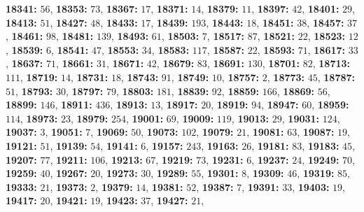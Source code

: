 \textsf{\bfseries 18341:} $56$, \textsf{\bfseries 18353:} $73$, \textsf{\bfseries 18367:} $17$, \textsf{\bfseries 18371:} $14$, \textsf{\bfseries 18379:} $11$, \textsf{\bfseries 18397:} $42$, \textsf{\bfseries 18401:} $29$, \textsf{\bfseries 18413:} $51$, \textsf{\bfseries 18427:} $48$, \textsf{\bfseries 18433:} $17$, \textsf{\bfseries 18439:} $193$, \textsf{\bfseries 18443:} $18$, \textsf{\bfseries 18451:} $38$, \textsf{\bfseries 18457:} $37$, \textsf{\bfseries 18461:} $98$, \textsf{\bfseries 18481:} $139$, \textsf{\bfseries 18493:} $61$, \textsf{\bfseries 18503:} $7$, \textsf{\bfseries 18517:} $87$, \textsf{\bfseries 18521:} $22$, \textsf{\bfseries 18523:} $12$, \textsf{\bfseries 18539:} $6$, \textsf{\bfseries 18541:} $47$, \textsf{\bfseries 18553:} $34$, \textsf{\bfseries 18583:} $117$, \textsf{\bfseries 18587:} $22$, \textsf{\bfseries 18593:} $71$, \textsf{\bfseries 18617:} $33$, \textsf{\bfseries 18637:} $71$, \textsf{\bfseries 18661:} $31$, \textsf{\bfseries 18671:} $42$, \textsf{\bfseries 18679:} $83$, \textsf{\bfseries 18691:} $130$, \textsf{\bfseries 18701:} $82$, \textsf{\bfseries 18713:} $111$, \textsf{\bfseries 18719:} $14$, \textsf{\bfseries 18731:} $18$, \textsf{\bfseries 18743:} $91$, \textsf{\bfseries 18749:} $10$, \textsf{\bfseries 18757:} $2$, \textsf{\bfseries 18773:} $45$, \textsf{\bfseries 18787:} $51$, \textsf{\bfseries 18793:} $30$, \textsf{\bfseries 18797:} $79$, \textsf{\bfseries 18803:} $181$, \textsf{\bfseries 18839:} $92$, \textsf{\bfseries 18859:} $166$, \textsf{\bfseries 18869:} $56$, \textsf{\bfseries 18899:} $146$, \textsf{\bfseries 18911:} $436$, \textsf{\bfseries 18913:} $13$, \textsf{\bfseries 18917:} $20$, \textsf{\bfseries 18919:} $94$, \textsf{\bfseries 18947:} $60$, \textsf{\bfseries 18959:} $114$, \textsf{\bfseries 18973:} $23$, \textsf{\bfseries 18979:} $254$, \textsf{\bfseries 19001:} $69$, \textsf{\bfseries 19009:} $119$, \textsf{\bfseries 19013:} $29$, \textsf{\bfseries 19031:} $124$, \textsf{\bfseries 19037:} $3$, \textsf{\bfseries 19051:} $7$, \textsf{\bfseries 19069:} $50$, \textsf{\bfseries 19073:} $102$, \textsf{\bfseries 19079:} $21$, \textsf{\bfseries 19081:} $63$, \textsf{\bfseries 19087:} $19$, \textsf{\bfseries 19121:} $51$, \textsf{\bfseries 19139:} $54$, \textsf{\bfseries 19141:} $6$, \textsf{\bfseries 19157:} $243$, \textsf{\bfseries 19163:} $26$, \textsf{\bfseries 19181:} $83$, \textsf{\bfseries 19183:} $45$, \textsf{\bfseries 19207:} $77$, \textsf{\bfseries 19211:} $106$, \textsf{\bfseries 19213:} $67$, \textsf{\bfseries 19219:} $73$, \textsf{\bfseries 19231:} $6$, \textsf{\bfseries 19237:} $24$, \textsf{\bfseries 19249:} $70$, \textsf{\bfseries 19259:} $40$, \textsf{\bfseries 19267:} $20$, \textsf{\bfseries 19273:} $30$, \textsf{\bfseries 19289:} $55$, \textsf{\bfseries 19301:} $8$, \textsf{\bfseries 19309:} $46$, \textsf{\bfseries 19319:} $85$, \textsf{\bfseries 19333:} $21$, \textsf{\bfseries 19373:} $2$, \textsf{\bfseries 19379:} $14$, \textsf{\bfseries 19381:} $52$, \textsf{\bfseries 19387:} $7$, \textsf{\bfseries 19391:} $33$, \textsf{\bfseries 19403:} $19$, \textsf{\bfseries 19417:} $20$, \textsf{\bfseries 19421:} $19$, \textsf{\bfseries 19423:} $37$, \textsf{\bfseries 19427:} $21$, 
